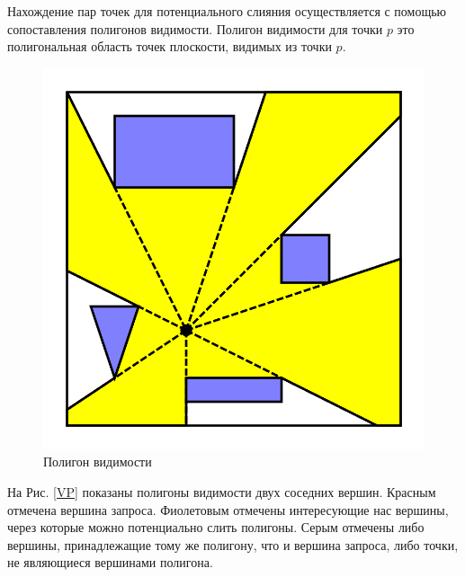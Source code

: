 \documentclass{fefu_thesis/cls/fefu}
\begin{document}
    Нахождение пар точек для потенциального слияния осуществляется с помощью сопоставления полигонов видимости. Полигон видимости для точки $p$ это полигональная область точек плоскости, видимых из точки $p$.

    \begin{figure}[H]
        \centering
        \includegraphics[scale=0.35]{images/visibility_polygon.png}
        \caption{Полигон видимости}
    \end{figure}

    На Рис. \ref{VP} показаны полигоны видимости двух соседних вершин. Красным отмечена вершина запроса. Фиолетовым отмечены интересующие нас вершины, через которые можно потенциально слить полигоны. Серым отмечены либо вершины, принадлежащие тому же полигону, что и вершина запроса, либо точки, не являющиеся вершинами полигона.
\end{document}
